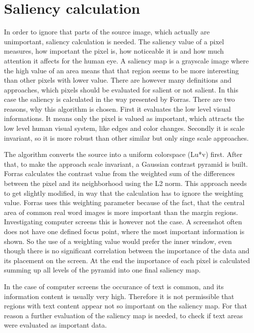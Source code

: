 \documentclass[draft,final]{vutinfth} %
\begin{document}
	\section{Saliency calculation}
	In order to ignore that parts of the source image, which actually are unimportant, saliency calculation is needed.
	The saliency value of a pixel measures, how important the pixel is, how noticeable it is and how much attention it affects for the human eye.
	A saliency map is a grayscale image where the high value of an area means that that region seems to be more interesting than other pixels with lower value.
	There are however many definitions and approaches, which pixels should be evaluated for salient or not salient.
	In this case the saliency is calculated in the way presented by Forras. 
	There are two reasons, why this algorithm is chosen.
	First it evaluates the low level visual informations.
	It means only the pixel is valued as important, which attracts the low level human visual system, like edges and color changes.
	Secondly it is scale invariant, so it is more robust than other similar but only singe scale approaches.\par 
	The algorithm converts the source into a uniform colorspace (Lu*v) first.
	After that, to make the approach scale invariant, a Gaussian contrast pyramid is built.
	Forras calculates the contrast value from the weighted sum of  the  differences between the pixel and its neighborhood using the L2 norm.
	This approach needs to get slightly modified, in way that the calculation has to ignore the weighting value.
	Forras uses this weighting parameter because of the fact, that the central area of common real word images is more important than the margin regions.
	Investigating computer screens this is however not the case.
	A screenshot often does not have one defined focus point, where the most important information is shown.
	So the use of a weighting value would prefer the inner window, even though there is no significant correlation between the importance of the data and its placement on the screen.
	At the end the importance of each pixel is calculated summing up all levels of the pyramid into one final saliency map.\par
	In the case of computer screens the occurance of text is common, and its information content is usually very high.
	Therefore it is not permissible that regions with text content appear not so important on the saliency map.
	For that reason a further evaluation of the saliency map is needed, to check if text areas were evaluated as important data.\par 
\end{document}
